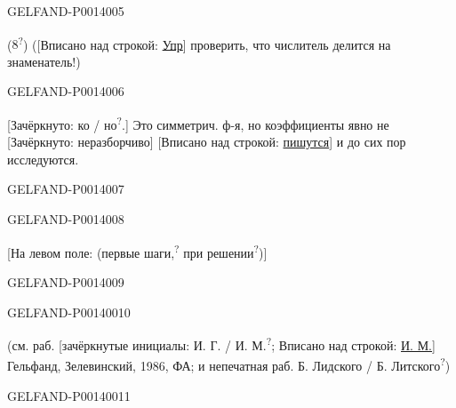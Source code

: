 \begin{GelfandAdjacentEvidence}{GELFAND-P001400}{5}


(\(8\)\textsuperscript{?})
([Вписано над строкой: \uline{Упр}] проверить, что числитель делится на знаменатель!)

\end{GelfandAdjacentEvidence}
\begin{GelfandAdjacentEvidence}{GELFAND-P001400}{6}



[Зачёркнуто: ко / но\textsuperscript{?}.]
Это симметрич. ф-я, но коэффициенты явно не
[Зачёркнуто: неразборчиво]
[Вписано над строкой: \uline{пишутся}] и до сих пор исследуются.

\end{GelfandAdjacentEvidence}
\begin{GelfandAdjacentEvidence}{GELFAND-P001400}{7}

\end{GelfandAdjacentEvidence}
\begin{GelfandAdjacentEvidence}{GELFAND-P001400}{8}



[На левом поле: (первые шаги,\textsuperscript{?}
при решении\textsuperscript{?})]

\end{GelfandAdjacentEvidence}
\begin{GelfandAdjacentEvidence}{GELFAND-P001400}{9}

\end{GelfandAdjacentEvidence}
\begin{GelfandAdjacentEvidence}{GELFAND-P001400}{10}



(см. раб. [зачёркнутые инициалы:
И. Г. / И. М.\textsuperscript{?};
Вписано над строкой: \uline{И. М.}] Гельфанд, Зелевинский, 1986, ФА; и непечатная раб.
Б. Лидского / Б. Литского\textsuperscript{?})

\end{GelfandAdjacentEvidence}
\begin{GelfandAdjacentEvidence}{GELFAND-P001400}{11}

\end{GelfandAdjacentEvidence}
